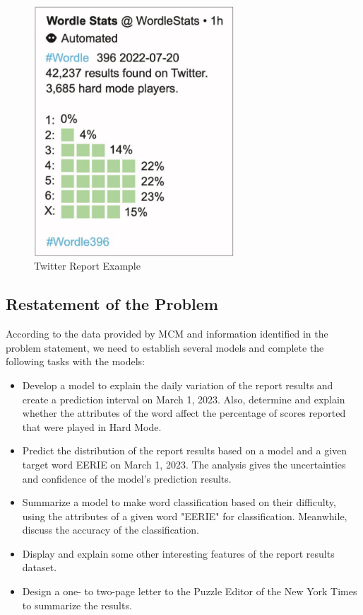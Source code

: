 \documentclass[12pt]{article}
\begin{document}
\begin{figure}[h]
    \centering
    \includegraphics[width=7.5cm]{figures/twitter.png}
    \caption{Twitter Report Example}
    \label{twitter}
\end{figure}

\subsection{Restatement of the Problem}
According to the data provided by MCM and information identified in the problem statement, we need to establish several models and complete the following tasks with the models:

\begin{itemize}
  \item {Develop a model to explain the daily variation of the report results and create a prediction interval on March 1, 2023. Also, determine and explain whether the attributes of the word affect the percentage of scores reported that were played in Hard Mode.}
  \item {Predict the distribution of the report results based on a model and a given target word EERIE on March 1, 2023. The analysis gives the uncertainties and confidence of the model's prediction results.}
  \item {Summarize a model to make word classification based on their difficulty, using the attributes of a given word "EERIE" for classification. Meanwhile, discuss the accuracy of the classification.}
  \item {Display and explain some other interesting features of the report results dataset.}
  \item {Design a one- to two-page letter to the Puzzle Editor of the New York Times to summarize the results.}
\end{itemize}
\end{document}
